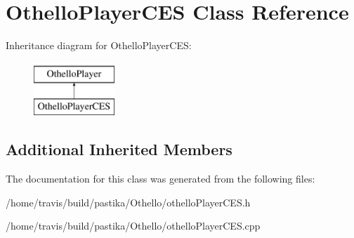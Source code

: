 \hypertarget{classOthelloPlayerCES}{\section{Othello\-Player\-C\-E\-S Class Reference}
\label{classOthelloPlayerCES}
}
Inheritance diagram for Othello\-Player\-C\-E\-S\-:\begin{figure}[H]
\begin{center}
\leavevmode
\includegraphics[height=2.000000cm]{classOthelloPlayerCES}
\end{center}
\end{figure}
\subsection*{Additional Inherited Members}


The documentation for this class was generated from the following files\-:\begin{DoxyCompactItemize}
\item 
/home/travis/build/pastika/\-Othello/othello\-Player\-C\-E\-S.\-h\item 
/home/travis/build/pastika/\-Othello/othello\-Player\-C\-E\-S.\-cpp\end{DoxyCompactItemize}
